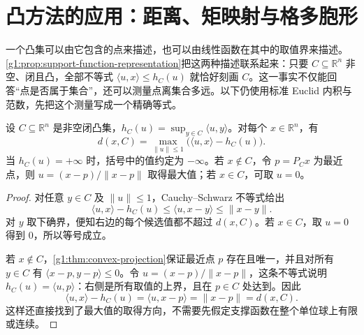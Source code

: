 
% 
% 
% 

\section{凸方法的应用：距离、矩映射与格多胞形}
\label{g1:sec:0304}

一个凸集可以由它包含的点来描述，也可以由线性函数在其中的取值界来描述。\cref{g1:prop:support-function-representation}把这两种描述联系起来：只要 \(C\subseteq\mathbb R^n\) 非空、闭且凸，全部不等式 \(\langle u,x\rangle\le h_C(u)\) 就恰好刻画 \(C\)。这一事实不仅能回答“点是否属于集合”，还可以测量点离集合多远。以下仍使用标准 Euclid 内积与范数，先把这个测量写成一个精确等式。

\begin{proposition}\label{g1:prop:distance-support-formula}
	设 \(C\subseteq\mathbb R^n\) 是非空闭凸集，\(h_C(u)=\sup_{y\in C}\langle u,y\rangle\)。对每个 \(x\in\mathbb R^n\)，有
	\begin{equation}\label{g1:eq:distance-support-formula}
		d(x,C)=\max_{\lVert u\rVert\le1}\bigl(\langle u,x\rangle-h_C(u)\bigr).
	\end{equation}
	当 \(h_C(u)=+\infty\) 时，括号中的值约定为 \(-\infty\)。若 \(x\notin C\)，令 \(p=P_Cx\) 为最近点，则 \(u=(x-p)/\lVert x-p\rVert\) 取得最大值；若 \(x\in C\)，可取 \(u=0\)。
\end{proposition}
\begin{proof}
	对任意 \(y\in C\) 及 \(\lVert u\rVert\le1\)，Cauchy--Schwarz 不等式给出
	\[
		\langle u,x\rangle-h_C(u)\le\langle u,x-y\rangle\le\lVert x-y\rVert.
	\]
	对 \(y\) 取下确界，便知右边的每个候选值都不超过 \(d(x,C)\)。若 \(x\in C\)，取 \(u=0\) 得到 \(0\)，所以等号成立。

	若 \(x\notin C\)，\cref{g1:thm:convex-projection}保证最近点 \(p\) 存在且唯一，并且对所有 \(y\in C\) 有 \(\langle x-p,y-p\rangle\le0\)。令 \(u=(x-p)/\lVert x-p\rVert\)，这条不等式说明 \(h_C(u)=\langle u,p\rangle\)：右侧是所有取值的上界，且在 \(p\in C\) 处达到。因此
	\[
		\langle u,x\rangle-h_C(u)=\langle u,x-p\rangle=\lVert x-p\rVert=d(x,C).
	\]
	这样还直接找到了最大值的取得方向，不需要先假定支撑函数在整个单位球上有限或连续。
\end{proof}

